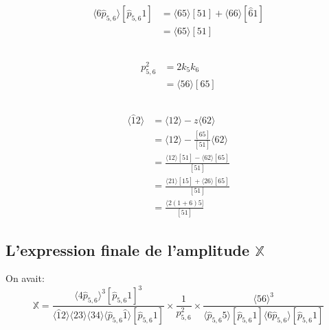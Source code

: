 \documentclass[12pt, a4paper]{article}
\begin{document}
		\subsection{}
		\begin{equation}
			\begin{split}
				\langle 6\hat{p}_{5,6} \rangle[\hat{p}_{5,6}1]
				&= \langle 65  \rangle[51] + \langle 66 \rangle [\hat{6}1]\\
				&= \langle 65 \rangle [51]
			\end{split}
		\end{equation}
		
		\subsection{}
		\begin{equation}
			\begin{split}
				p_{5,6}^2
				&= 2 k_5 k_6\\
				&= \langle 56 \rangle [65]
			\end{split}
		\end{equation}
		
		\subsection{}
		\begin{equation}
			\begin{split}
				\langle \hat{1}2 \rangle
				&= \langle 12 \rangle -z \langle 62 \rangle \\
				&= \langle 12 \rangle -\frac{[65]}{[51]} \langle 62 \rangle \\
				&= \frac{\langle 12 \rangle[51]-\langle 62 \rangle[65]}{[51]} \\
				&= \frac{\langle 21 \rangle[15]+\langle 26 \rangle[65]}{[51]} \\
				&= \frac{\langle 2(1+6)5]}{[51]}
			\end{split}
		\end{equation}
		
		\subsection{L'expression finale de l'amplitude $\mathbb{X}$}
		On avait:
		\[\mathbb{X}=\frac{\langle 4 \hat{p}_{5,6} \rangle^3 [\hat{p}_{5,6}1]^3}
		{\langle \hat{1}2 \rangle \langle 23 \rangle \langle 34 \rangle 
			\langle \hat{p}_{5,6}\hat{1} \rangle [\hat{p}_{5,6}1] } \times \frac{1}{p_{5,6}^2} \times \frac{\langle 56 \rangle^3}
		{\langle \hat{p}_{5,6} 5 \rangle[\hat{p}_{5,6}1] 
			\langle 6\hat{p}_{5,6} \rangle[\hat{p}_{5,6}1]}\]
		
\end{document}
